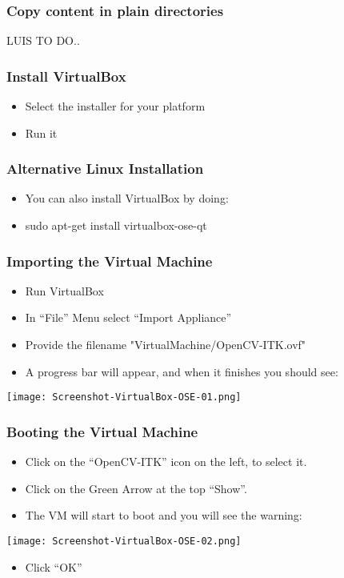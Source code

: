 \begin{frame}
\frametitle{Copy content in plain directories}
LUIS TO DO..
\end{frame}


\begin{frame}
\frametitle{Install VirtualBox}
\begin{itemize}
\item Select the installer for your platform
\item Run it
\end{itemize}
\end{frame}

\begin{frame}
\frametitle{Alternative Linux Installation}
\begin{itemize}
\item  You can also install VirtualBox by doing:
\item  sudo apt-get install virtualbox-ose-qt
\end{itemize}
\end{frame}

\begin{frame}
\frametitle{Importing the Virtual Machine}
\begin{itemize}
\item Run VirtualBox
\item In ``File'' Menu select ``Import Appliance''
\item Provide the filename "VirtualMachine/OpenCV-ITK.ovf"
\item A progress bar will appear, and when it finishes you should see:
\end{itemize}
\begin{center}
  \texttt{[image: Screenshot-VirtualBox-OSE-01.png]}
\end{center}
\end{frame}

\begin{frame}
\frametitle{Booting the Virtual Machine}
\begin{itemize}
\item Click on the ``OpenCV-ITK'' icon on the left, to select it.
\item Click on the Green Arrow at the top ``Show''.
\item The VM will start to boot and you will see the warning:
\end{itemize}
\begin{center}
  \texttt{[image: Screenshot-VirtualBox-OSE-02.png]}
\end{center}
\begin{itemize}
\item Click ``OK''
\end{itemize}
\end{frame}

